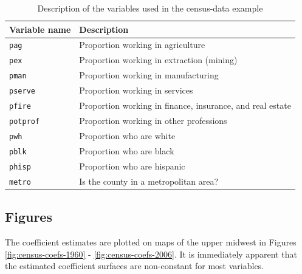 \documentclass[authoryear, review, 11pt]{elsarticle}
\begin{document}
	\begin{table}
		\begin{center}
		\begin{tabular}{ll}
			Variable name & Description \\
			\hline
			\verb!pag! & Proportion working in agriculture\\
			\verb!pex! &  Proportion working in extraction (mining)\\
			\verb!pman! & Proportion working in manufacturing \\
			\verb!pserve! & Proportion working in services \\
			\verb!pfire! & Proportion working in finance, insurance, and real estate \\
			\verb!potprof! & Proportion working in other professions \\
			\verb!pwh! & Proportion who are white \\
			\verb!pblk! & Proportion who are black \\
			\verb!phisp! & Proportion who are hispanic \\
			\verb!metro! & Is the county in a metropolitan area?\\
		\end{tabular}
		\caption{Description of the variables used in the census-data example\label{table:census-vars}}
		\end{center}		
	\end{table}
	
	\subsection{Figures}
	The coefficient estimates are plotted on maps of the upper midwest in Figures \ref{fig:census-coefs-1960} - \ref{fig:census-coefs-2006}. It is immediately apparent that the estimated coefficient surfaces are non-constant for most variables.\\
		
\end{document}
